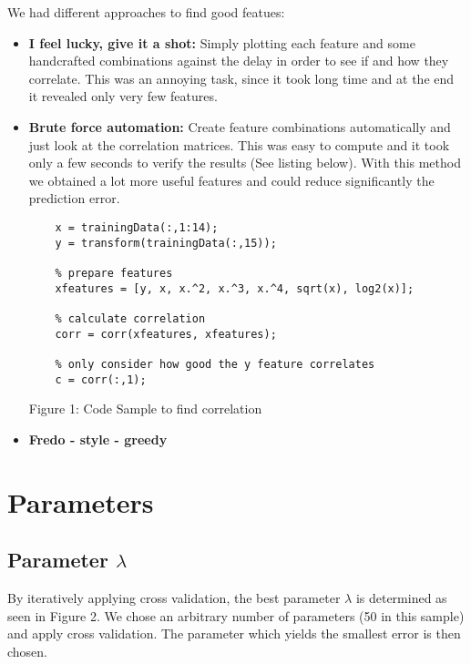 \documentclass[a4paper, 11pt]{article}
\begin{document}
We had different approaches to find good featues:

\begin{itemize}
	\item \textbf{I feel lucky, give it a shot:} Simply plotting each feature and some handcrafted combinations against the delay in order to see if and how they correlate. This was an annoying task, since it took long time and at the end it revealed only very few features.

	\item \textbf{Brute force automation:} Create feature combinations automatically and just look at the correlation matrices. This was easy to compute and it took only a few seconds to verify the results (See listing below). With this method we obtained a lot more useful features and could reduce significantly the prediction error.
	\begin{center}
	\begin{lstlisting} 
	x = trainingData(:,1:14);
	y = transform(trainingData(:,15));

	% prepare features
	xfeatures = [y, x, x.^2, x.^3, x.^4, sqrt(x), log2(x)];

	% calculate correlation
	corr = corr(xfeatures, xfeatures);

	% only consider how good the y feature correlates
	c = corr(:,1);
	\end{lstlisting}
	Figure 1: Code Sample to find correlation
	\end{center}

	\item \textbf{Fredo - style - greedy}
\end{itemize}



\section{Parameters}

\subsection{Parameter $\lambda$}

By iteratively applying cross validation, the best parameter $\lambda$ is determined as seen in Figure 2. We chose an arbitrary number of parameters (50 in this sample) and apply cross validation. The parameter which yields the smallest error is then chosen.
\end{document}
